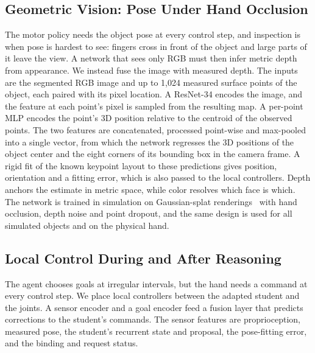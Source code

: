 \subsection{Geometric Vision: Pose Under Hand Occlusion}
\label{sec:pose}
The motor policy needs the object pose at every control step, and inspection is when pose is hardest to see: fingers cross in front of the object and large parts of it leave the view. A network that sees only RGB must then infer metric depth from appearance. We instead fuse the image with measured depth. The inputs are the segmented RGB image and up to 1,024 measured surface points of the object, each paired with its pixel location. A ResNet-34 encodes the image, and the feature at each point's pixel is sampled from the resulting map. A per-point MLP encodes the point's 3D position relative to the centroid of the observed points. The two features are concatenated, processed point-wise and max-pooled into a single vector, from which the network regresses the 3D positions of the object center and the eight corners of its bounding box in the camera frame. A rigid fit of the known keypoint layout to these predictions gives position, orientation and a fitting error, which is also passed to the local controllers. Depth anchors the estimate in metric space, while color resolves which face is which. The network is trained in simulation on Gaussian-splat renderings~\cite{bhardwaj2026viserdex} with hand occlusion, depth noise and point dropout, and the same design is used for all simulated objects and on the physical hand.

\subsection{Local Control During and After Reasoning}
\label{sec:wait}
The agent chooses goals at irregular intervals, but the hand needs a command at every control step. We place local controllers between the adapted student and the joints. A sensor encoder and a goal encoder feed a fusion layer that predicts corrections to the student's commands. The sensor features are proprioception, measured pose, the student's recurrent state and proposal, the pose-fitting error, and the binding and request status.

